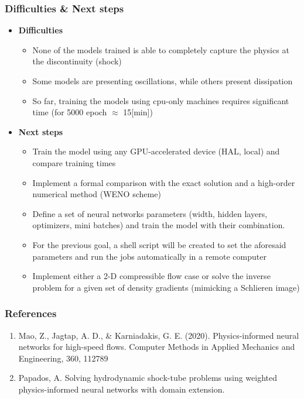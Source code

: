 \documentclass[aspectratio=169]{beamer}
\begin{document}
\begin{frame}\frametitle{Difficulties \& Next steps}

	\begin{itemize}
		\item \textbf{\textcolor{myOrange}{Difficulties}}
			
			\begin{itemize}
				\item None of the models trained is able to completely capture the physics at the discontinuity (shock)
				\item Some models are presenting oscillations, while others present dissipation 
				\item So far, training the models using cpu-only machines requires significant time (for 5000 epoch $\approx$ 15[min])
			\end{itemize}
		
		\vspace{3mm}
		
		\item \textbf{\textcolor{myOrange}{Next steps}}
		
		\begin{itemize}
			\item Train the model using any GPU-accelerated device (HAL, local) and compare training times
			\item Implement a formal comparison with the exact solution and a high-order numerical method (WENO scheme)
			\item Define a set of neural networks parameters (width, hidden layers, optimizers, mini batches) and train the model with
			their combination. 
			\item For the previous goal, a shell script will be created to set the aforesaid parameters and run the jobs automatically
			in a remote computer		
			\item Implement either a 2-D compressible flow case or solve the inverse problem for a given set of density gradients (mimicking a Schlieren image)
		\end{itemize}	
		
	\end{itemize}

\end{frame}

\begin{frame}\frametitle{References}
	
	\begin{enumerate}
		\item Mao, Z., Jagtap, A. D., \& Karniadakis, G. E. (2020). Physics-informed neural networks for high-speed flows. Computer Methods in Applied Mechanics and Engineering, 360, 112789
		\item Papados, A. Solving hydrodynamic shock-tube problems using weighted physics-informed neural networks with domain extension.
	\end{enumerate}
	
\end{frame}
\end{document}
